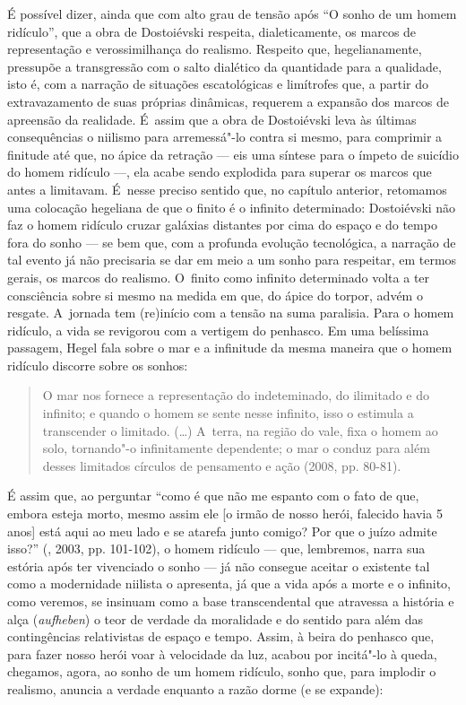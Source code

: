 É possível dizer, ainda que com alto grau de tensão após ``O sonho de um
homem ridículo'', que a obra de Dostoiévski respeita, dialeticamente, os
marcos de representação e verossimilhança do realismo. Respeito que,
hegelianamente, pressupõe a transgressão com o salto dialético da
quantidade para a qualidade, isto é, com a narração de situações
escatológicas e limítrofes que, a partir do extravazamento de suas
próprias dinâmicas, requerem a expansão dos marcos de apreensão da
realidade. É~assim que a obra de Dostoiévski leva às últimas
consequências o niilismo para arremessá"-lo contra si mesmo, para
comprimir a finitude até que, no ápice da retração --- eis uma síntese
para o ímpeto de suicídio do homem ridículo ---, ela acabe sendo
explodida para superar os marcos que antes a limitavam. É~nesse preciso
sentido que, no capítulo anterior, retomamos uma colocação hegeliana de
que o finito é o infinito determinado: Dostoiévski não faz o homem
ridículo cruzar galáxias distantes por cima do espaço e do tempo fora do
sonho --- se bem que, com a profunda evolução tecnológica, a narração de
tal evento já não precisaria se dar em meio a um sonho para respeitar,
em termos gerais, os marcos do realismo. O~finito como infinito
determinado volta a ter consciência sobre si mesmo na medida em que, do
ápice do torpor, advém o resgate. A~jornada tem (re)início com a tensão
na suma paralisia. Para o homem ridículo, a vida se revigorou com a
vertigem do penhasco. Em uma belíssima passagem, Hegel fala sobre o mar
e a infinitude da mesma maneira que o homem ridículo discorre sobre os
sonhos:

\begin{quote}
O mar nos fornece a representação do indeteminado, do ilimitado e do
infinito; e quando o homem se sente nesse infinito, isso o estimula a
transcender o limitado. (\ldots) A~terra, na região do vale, fixa o homem
ao solo, tornando"-o infinitamente dependente; o mar o conduz para além
desses limitados círculos de pensamento e ação (2008, pp. 80-81).
\end{quote}

É assim que, ao perguntar ``como é que não me espanto com o fato de que,
embora esteja morto, mesmo assim ele {[}o irmão de nosso herói, falecido
havia 5 anos{]} está aqui ao meu lado e se atarefa junto comigo? Por que
o juízo admite isso?'' (, 2003, pp. 101-102), o homem
ridículo --- que, lembremos, narra sua estória após ter vivenciado o
sonho --- já não consegue aceitar o existente tal como a modernidade
niilista o apresenta, já que a vida após a morte e o infinito, como
veremos, se insinuam como a base transcendental que atravessa a história
e alça (\emph{aufheben}) o teor de verdade da moralidade e do sentido
para além das contingências relativistas de espaço e tempo. Assim, à
beira do penhasco que, para fazer nosso herói voar à velocidade da luz,
acabou por incitá"-lo à queda, chegamos, agora, ao sonho de um homem
ridículo, sonho que, para implodir o realismo, anuncia a verdade
enquanto a razão dorme (e se expande):

